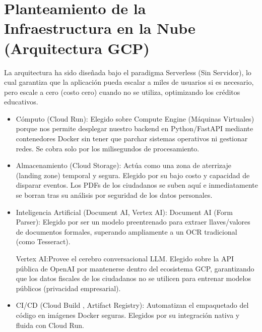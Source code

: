 \documentclass[10pt,a4paper]{article}
\begin{document}
\newpage

\section{Planteamiento de la Infraestructura en la Nube (Arquitectura GCP)}

\vspace{2mm}

La arquitectura ha sido diseñada bajo el paradigma Serverless (Sin Servidor),
lo cual garantiza que la aplicación pueda escalar a miles de usuarios si es necesario, pero escale a cero (costo cero) 
cuando no se utiliza, optimizando los créditos educativos.

\begin{itemize}
    \item Cómputo (Cloud Run):
    Elegido sobre Compute Engine (Máquinas Virtuales) porque nos permite desplegar 
    nuestro backend en Python/FastAPI mediante contenedores 
    Docker sin tener que parchar sistemas operativos ni gestionar redes. 
    Se cobra solo por los milisegundos de procesamiento.
    \item Almacenamiento (Cloud Storage): Actúa como una zona de aterrizaje (landing zone) temporal y segura.
    Elegido por su bajo costo y capacidad de disparar eventos. 
    Los PDFs de los ciudadanos se suben aquí e inmediatamente se borran tras su 
    análisis por seguridad de los datos personales.
    \item Inteligencia Artificial (Document AI, Vertex AI):
    Document AI (Form Parser): Elegido por ser un modelo preentrenado 
    para extraer llaves/valores de documentos formales, 
    superando ampliamente a un OCR tradicional (como Tesseract).

    \vspace{2mm}

    Vertex AI:Provee el cerebro conversacional LLM. 
    Elegido sobre la API pública de OpenAI por mantenerse dentro del 
    ecosistema GCP, garantizando que los datos fiscales de los ciudadanos
     no se utilicen para entrenar modelos públicos (privacidad empresarial).
    \item CI/CD (Cloud Build , Artifact Registry): 
    Automatizan el empaquetado del código en imágenes Docker seguras. 
    Elegidos por su integración nativa y fluida con Cloud Run.
\end{itemize}
\end{document}

